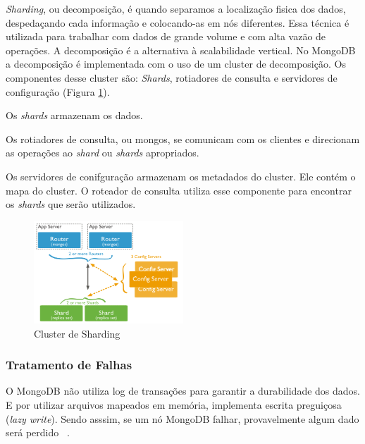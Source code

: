\textit{Sharding}, ou decomposição, é quando separamos a localização fisica dos dados, despedaçando cada informação e colocando-as em nós diferentes. Essa técnica é utilizada para trabalhar com dados de grande volume e com alta vazão de operações. A decomposição é a alternativa à scalabilidade vertical. No MongoDB a decomposição é implementada com o uso de um cluster de decomposição. Os componentes desse cluster são: \textit{Shards}, rotiadores de consulta e servidores de configuração (Figura \ref{fig:sharding}).

Os \textit{shards} armazenam os dados.

Os rotiadores de consulta, ou mongos, se comunicam com os clientes e direcionam as operações ao \textit{shard} ou \textit{shards} apropriados.

Os servidores de conifguração armazenam os metadados do cluster. Ele contém o mapa do cluster. O roteador de consulta utiliza esse componente para encontrar os \textit{shards} que serão utilizados.

	\begin{figure}[!htbp]
		\begin{center}
			\includegraphics[width=0.5\textwidth]{sharding}
		\end{center}
		\caption{Cluster de Sharding ~\cite{sitemongodb}}
		\label{fig:sharding}
	\end{figure}

\subsubsection{Tratamento de Falhas}

O MongoDB não utiliza log de transações para garantir a durabilidade dos dados. E por utilizar arquivos mapeados em memória, implementa escrita preguiçosa (\textit{lazy write}). Sendo asssim, se um nó MongoDB falhar, provavelmente algum dado será perdido ~\cite{Orendanalysisand}.